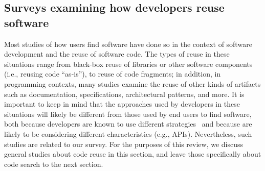 \documentclass{casicswhitepaper}
\begin{document}
\subsection{Surveys examining how developers reuse software}

Most studies of how users find software have done so in the context of software development and the reuse of software code.  The types of reuse in these situations range from black-box reuse of libraries or other software components (i.e., reusing code ``as-is''), to reuse of code fragments; in addition, in programming contexts, many studies examine the reuse of other kinds of artifacts such as documentation, specifications, architectural patterns, and more.  It is important to keep in mind that the approaches used by developers in these situations will likely be different from those used by end users to find software, both because developers are known to use different strategies~\cite{} and because are likely to be considering different characteristics (e.g., APIs).  Nevertheless, such studies are related to our survey.  For the purposes of this review, we discuss general studies about code reuse in this section, and leave those specifically about code search to the next section.
\end{document}
